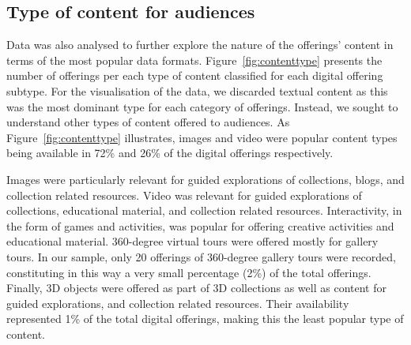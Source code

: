 \documentclass{egpubl}
\begin{document}



\subsection{Type of content for audiences}
Data was also analysed to further explore the nature of the offerings' content in terms of the most popular data formats. Figure~\ref{fig:contenttype} presents the number of offerings per each type of content classified for each digital offering subtype. For the visualisation of the data, we discarded textual content as this was the most dominant type for each category of offerings. Instead, we sought to understand other types of content offered to audiences. As Figure~\ref{fig:contenttype} illustrates, images and video were popular content types being available in 72\% and 26\% of the digital offerings respectively. 

Images were particularly relevant for guided explorations of collections, blogs, and collection related resources. Video was relevant for guided explorations of collections, educational material, and  collection related resources. Interactivity, in the form of games and activities, was popular for offering creative activities and educational material. 360-degree virtual tours were offered mostly for gallery tours. In our sample, only 20 offerings of 360-degree gallery tours were recorded, constituting in this way a very small percentage (2\%) of the total offerings. Finally, 3D objects were offered as part of 3D collections  as well as content for guided explorations, and collection related resources. Their availability represented 1\% of the total digital offerings, making this the least popular type of content. 
 
\end{document}
